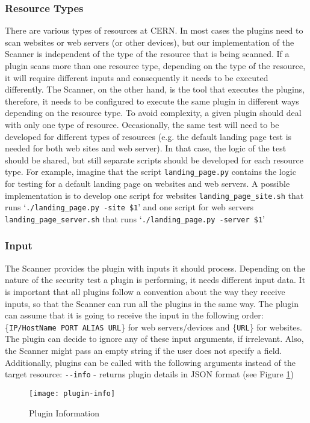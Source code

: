 \subsubsection{Resource Types}
There are various types of resources at CERN. In most cases the plugins need to scan websites or web servers (or other devices), but our implementation of the Scanner is independent of the type of the resource that is being scanned. If a plugin scans more than one resource type, depending on the type of the resource, it will require different inputs and consequently it needs to be executed differently. The Scanner, on the other hand, is the tool that executes the plugins, therefore, it needs to be configured to execute the same plugin in different ways depending on the resource type. To avoid complexity, a given plugin should deal with only one type of resource. Occasionally, the same test will need to be developed for different types of resources (e.g. the default landing page test is needed for both web sites and web server). In that case, the logic of the test should be shared, but still separate scripts should be developed for each resource type. For example, imagine that the script \texttt{landing\_page.py} contains the logic for testing for a default landing page on websites and web servers. A possible implementation is to develop one script for websites \texttt{landing\_page\_site.sh} that runs `\texttt{./landing\_page.py -site \$1}' and one script for web servers \texttt{landing\_page\_server.sh} that runs `\texttt{./landing\_page.py -server \$1}' 
\subsubsection{Input}
The Scanner provides the plugin with inputs it should process. Depending on the nature of the security test a plugin is performing, it needs different input data. It is important that all plugins follow a convention about the way they receive inputs, so that the Scanner can run all the plugins in the same way. The plugin can assume that it is going to receive the input in the following order: \{\texttt{IP/HostName PORT ALIAS URL}\} for web servers/devices and \{\texttt{URL}\} for websites. The plugin can decide to ignore any of these input arguments, if irrelevant. Also, the Scanner might pass an empty string if the user does not specify a field.
\\
Additionally, plugins can be called with the following arguments instead of the target resource:
\texttt{-{}-info} - returns plugin details in JSON format (see Figure \ref{figure:plugin-info})  
\begin{figure}[h!]

  \centering
    \texttt{[image: plugin-info]}
  \caption{Plugin Information}
\label{figure:plugin-info}
  
\end{figure}
